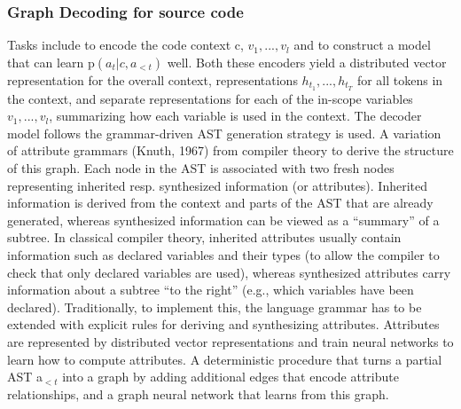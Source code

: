 \documentclass{article}
\begin{document}
\subsubsection{Graph Decoding for source code}
Tasks include to encode the code context c, $v_1, . . . , v_l$ and to construct a model that can learn p$(a_t | c,a_{<t})$ well. Both these encoders yield a distributed vector representation for the overall context, representations $h_{t_1} , . . . , h_{t_T}$ for all tokens in the context, and separate representations for each of the in-scope variables $v_1, . . . , v_l$, summarizing how each variable is used in the context. The decoder model follows the grammar-driven AST generation strategy is used. A variation of attribute grammars (Knuth, 1967) from compiler theory to derive the structure of this graph. Each node in the AST is associated with two fresh nodes representing inherited resp. synthesized information (or attributes). Inherited information is derived from the context and parts of the AST that are already generated, whereas synthesized information can be viewed as a “summary” of a subtree. In classical compiler theory, inherited attributes usually contain information such as declared variables and their types (to allow the compiler to check that only declared variables are used), whereas synthesized attributes carry information about a subtree “to the right” (e.g., which variables have been declared). Traditionally, to implement this, the language grammar has to be extended with explicit rules for deriving and synthesizing attributes. Attributes are represented by distributed vector representations and train neural networks to learn how to compute attributes. A deterministic procedure that turns a partial AST a$_{<t}$ into a graph by adding additional edges that encode attribute relationships, and a graph neural network that learns from this graph.
\end{document}
